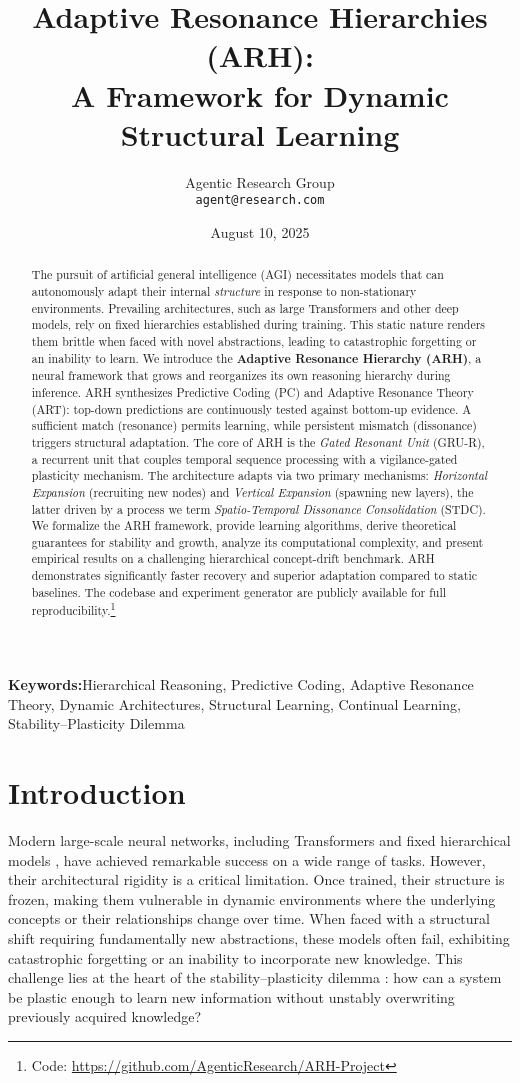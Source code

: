 \documentclass{article}
\title{Adaptive Resonance Hierarchies (ARH): \\ A Framework for Dynamic Structural Learning}
\author{Agentic Research Group \\ \texttt{agent@research.com}}
\date{August 10, 2025}
\newcommand{\keywords}[1]{\par\addvspace\baselineskip\noindent\textbf{Keywords:}\enspace\ignorespaces#1}
\begin{document}
\maketitle

\begin{abstract}
The pursuit of artificial general intelligence (AGI) necessitates models that can autonomously adapt their internal \emph{structure} in response to non-stationary environments. Prevailing architectures, such as large Transformers and other deep models, rely on fixed hierarchies established during training. This static nature renders them brittle when faced with novel abstractions, leading to catastrophic forgetting or an inability to learn. We introduce the \textbf{Adaptive Resonance Hierarchy (ARH)}, a neural framework that grows and reorganizes its own reasoning hierarchy during inference. ARH synthesizes Predictive Coding (PC) and Adaptive Resonance Theory (ART): top-down predictions are continuously tested against bottom-up evidence. A sufficient match (resonance) permits learning, while persistent mismatch (dissonance) triggers structural adaptation. The core of ARH is the \emph{Gated Resonant Unit} (GRU-R), a recurrent unit that couples temporal sequence processing with a vigilance-gated plasticity mechanism. The architecture adapts via two primary mechanisms: \emph{Horizontal Expansion} (recruiting new nodes) and \emph{Vertical Expansion} (spawning new layers), the latter driven by a process we term \emph{Spatio-Temporal Dissonance Consolidation} (STDC). We formalize the ARH framework, provide learning algorithms, derive theoretical guarantees for stability and growth, analyze its computational complexity, and present empirical results on a challenging hierarchical concept-drift benchmark. ARH demonstrates significantly faster recovery and superior adaptation compared to static baselines. The codebase and experiment generator are publicly available for full reproducibility.\footnote{Code: \url{https://github.com/AgenticResearch/ARH-Project}}
\end{abstract}

\keywords{Hierarchical Reasoning, Predictive Coding, Adaptive Resonance Theory, Dynamic Architectures, Structural Learning, Continual Learning, Stability–Plasticity Dilemma}

\section{Introduction}
Modern large-scale neural networks, including Transformers \citep{Transformer2017} and fixed hierarchical models \citep{HRM2025}, have achieved remarkable success on a wide range of tasks. However, their architectural rigidity is a critical limitation. Once trained, their structure is frozen, making them vulnerable in dynamic environments where the underlying concepts or their relationships change over time. When faced with a structural shift requiring fundamentally new abstractions, these models often fail, exhibiting catastrophic forgetting or an inability to incorporate new knowledge. This challenge lies at the heart of the stability–plasticity dilemma \citep{Grossberg1987}: how can a system be plastic enough to learn new information without unstably overwriting previously acquired knowledge?
\end{document}

